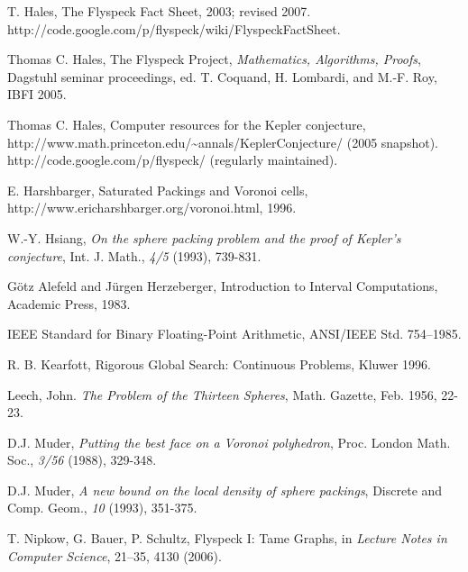 \documentclass{llncs}
\begin{document}
\begin{thebibliography}{HeHa94}
	   T. Hales, The Flyspeck Fact Sheet, 2003; revised
2007. http://code.google.com/p/flyspeck/wiki/FlyspeckFactSheet.
	
	  Thomas C. Hales, The Flyspeck Project, 
{\it Mathematics, Algorithms, Proofs}, Dagstuhl seminar proceedings, 
ed. T. Coquand, H. Lombardi, and M.-F. Roy,
IBFI 2005.
	






 Thomas C. Hales, Computer resources for the Kepler conjecture, \hfill\break
    http://www.math.princeton.edu/\~\!annals/KeplerConjecture/ (2005 snapshot).
    http://code.google.com/p/flyspeck/ (regularly maintained).
    
 E. Harshbarger, Saturated Packings and Voronoi cells, http://www.ericharshbarger.org/voronoi.html, 1996.

 W.-Y. Hsiang, {\it On the sphere packing problem and
the proof of Kepler's conjecture}, Int. J. Math., \emph{4/5} (1993),
739-831.

 G\"otz Alefeld and J\"urgen Herzeberger,
Introduction to Interval Computations, Academic Press, 1983.


 IEEE Standard for Binary Floating-Point Arithmetic,
ANSI/IEEE Std. 754--1985.

 R. B. Kearfott, Rigorous Global Search: Continuous
Problems, Kluwer 1996.

 Leech, John.  {\it The Problem of the Thirteen
Spheres}, Math. Gazette, Feb. 1956, 22-23.

 D.J. Muder, {\it Putting the best face on a Voronoi
polyhedron}, Proc. London Math. Soc., \emph{3/56} (1988), 329-348.

 D.J. Muder, {\it A new bound on the local density of
sphere packings}, Discrete and Comp. Geom., \emph{10} (1993), 351-375.

  T. Nipkow, G. Bauer, P. Schultz, Flyspeck I: Tame Graphs, in
{\it Lecture Notes in Computer Science}, 21--35, 4130 (2006). 


\end{thebibliography}
\end{document}
